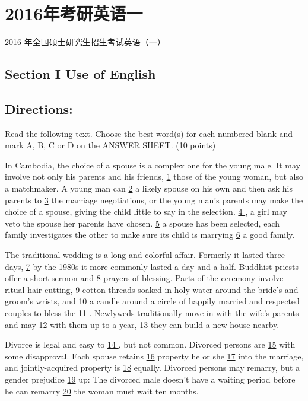 \documentclass[UTF8,11pt]{ctexart}
\begin{document}
\section*{2016年考研英语一}
2016 年全国硕士研究生招生考试英语（一）


\subsection*{\textbf{Section I Use of English}}


\subsection*{\textbf{Directions:}}


Read the following text. Choose the best word(s) for each numbered blank and mark A, B, C or D on the ANSWER SHEET. (10 points)


In Cambodia, the choice of a spouse is a complex one for the young male. It may involve not only his parents and his friends, \uline{1} those of the young woman, but also a matchmaker. A young man can \uline{2} a likely spouse on his own and then ask his parents to \uline{3} the marriage negotiations, or the young man’s parents may make the choice of a spouse, giving the child little to say in the selection. \uline{4 }, a girl may veto the spouse her parents have chosen. \uline{5} a spouse has been selected, each family investigates the other to make sure its child is marrying \uline{6} a good family.


The traditional wedding is a long and colorful affair. Formerly it lasted three days, \uline{7} by the 1980s it more commonly lasted a day and a half. Buddhist priests offer a short sermon and \uline{8} prayers of blessing. Parts of the ceremony involve ritual hair cutting, \uline{9} cotton threads soaked in holy water around the bride’s and groom’s wrists, and \uline{10} a candle around a circle of happily married and respected couples to bless the \uline{11 }. Newlyweds traditionally move in with the wife’s parents and may \uline{12} with them up to a year, \uline{13} they can build a new house nearby.


Divorce is legal and easy to \uline{14 }, but not common. Divorced persons are \uline{15} with some disapproval. Each spouse retains \uline{16} property he or she \uline{17} into the marriage, and jointly-acquired property is \uline{18} equally. Divorced persons may remarry, but a gender prejudice \uline{19} up: The divorced male doesn’t have a waiting period before he can remarry \uline{20} the woman must wait ten months.
\end{document}
